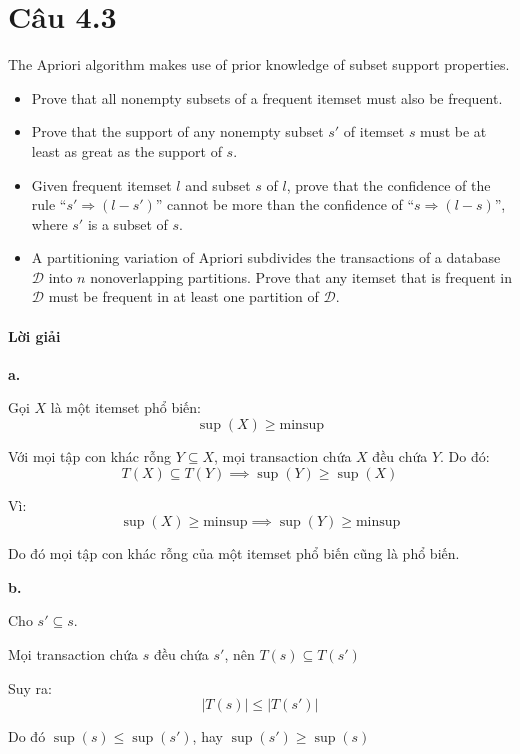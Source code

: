 \section{Câu 4.3}
\label{sec:4_3}

The Apriori algorithm makes use of prior knowledge of subset support properties.

\begin{itemize}
    \item[a.] Prove that all nonempty subsets of a frequent itemset must also be frequent.
    \item[b.] Prove that the support of any nonempty subset $s'$ of itemset $s$ must be at least as great as the support of $s$.
    \item[c.] Given frequent itemset $l$ and subset $s$ of $l$, prove that the confidence of the rule ``$s' \Rightarrow (l-s')$'' cannot be more than the confidence of ``$s \Rightarrow (l-s)$'', where $s'$ is a subset of $s$.
    \item[d.] A partitioning variation of Apriori subdivides the transactions of a database $\mathcal{D}$ into $n$ nonoverlapping partitions. Prove that any itemset that is frequent in $\mathcal{D}$ must be frequent in at least one partition of $\mathcal{D}$.
\end{itemize}

\paragraph{Lời giải}

\noindent \textbf{a.}

Gọi $X$ là một itemset phổ biến:
\[
    \sup(X)\ge \mathrm{minsup}
\]

Với mọi tập con khác rỗng $Y \subseteq X$, mọi transaction chứa $X$ đều chứa $Y$. Do đó:
\[
    T(X)\subseteq T(Y)
    \implies
    \sup(Y)\ge \sup(X)
\]

Vì:
\[
    \sup(X)\ge \mathrm{minsup}
    \implies
    \sup(Y)\ge \mathrm{minsup}
\]

Do đó mọi tập con khác rỗng của một itemset phổ biến cũng là phổ biến.

\bigskip

\noindent \textbf{b.}

Cho $s' \subseteq s$.

Mọi transaction chứa $s$ đều chứa $s'$, nên $T(s)\subseteq T(s')$

Suy ra:
\[
    |T(s)|\le |T(s')|
\]

Do đó $\sup(s)\le \sup(s')$, hay $\sup(s')\ge \sup(s)$

